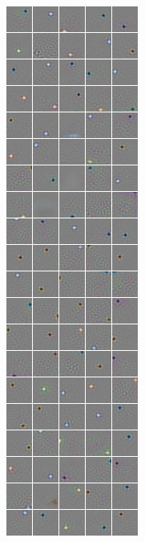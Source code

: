 {\begin{figure}
\begin{subfigure}[b]{0.2\textwidth}
\includegraphics[width=\x, height=\y]{./figures/SATAE/CIFAR_sat_linear300_1.png}
\caption{} \end{subfigure} \begin{subfigure}[b]{0.2\textwidth} \centering

\end{subfigure}
\end{figure}}
